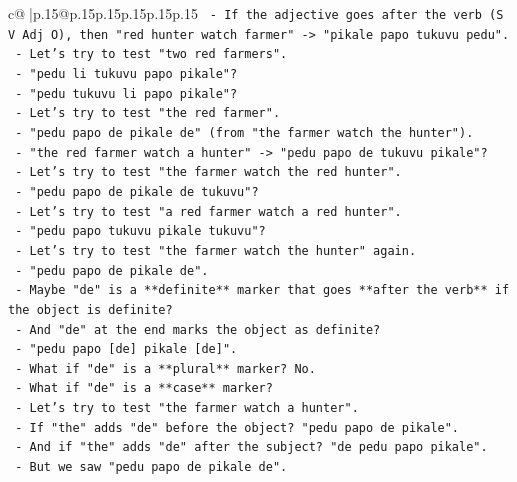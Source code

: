 \documentclass{article}
\begin{document}
{\begin{supertabular}{c@{$\;$}|p{.15\linewidth}@{}p{.15\linewidth}p{.15\linewidth}p{.15\linewidth}p{.15\linewidth}p{.15\linewidth}}
{{{\texttt{             {-} If the adjective goes after the verb (S V Adj O), then "red hunter watch farmer" {-}> "pikale papo tukuvu pedu".} \\
\texttt{           {-} Let's try to test "two red farmers".} \\
\texttt{             {-} "pedu li tukuvu papo pikale"?} \\
\texttt{             {-} "pedu tukuvu li papo pikale"?} \\
\texttt{           {-} Let's try to test "the red farmer".} \\
\texttt{             {-} "pedu papo de pikale de" (from "the farmer watch the hunter").} \\
\texttt{             {-} "the red farmer watch a hunter" {-}> "pedu papo de tukuvu pikale"?} \\
\texttt{           {-} Let's try to test "the farmer watch the red hunter".} \\
\texttt{             {-} "pedu papo de pikale de tukuvu"?} \\
\texttt{           {-} Let's try to test "a red farmer watch a red hunter".} \\
\texttt{             {-} "pedu papo tukuvu pikale tukuvu"?} \\
\texttt{           {-} Let's try to test "the farmer watch the hunter" again.} \\
\texttt{             {-} "pedu papo de pikale de".} \\
\texttt{             {-} Maybe "de" is a **definite** marker that goes **after the verb** if the object is definite?} \\
\texttt{             {-} And "de" at the end marks the object as definite?} \\
\texttt{             {-} "pedu papo {[}de{]} pikale {[}de{]}".} \\
\texttt{             {-} What if "de" is a **plural** marker? No.} \\
\texttt{             {-} What if "de" is a **case** marker?} \\
\texttt{             {-} Let's try to test "the farmer watch a hunter".} \\
\texttt{             {-} If "the" adds "de" before the object? "pedu papo de pikale".} \\
\texttt{             {-} And if "the" adds "de" after the subject? "de pedu papo pikale".} \\
\texttt{             {-} But we saw "pedu papo de pikale de".} \\
}}}
\end{supertabular}}
\end{document}
